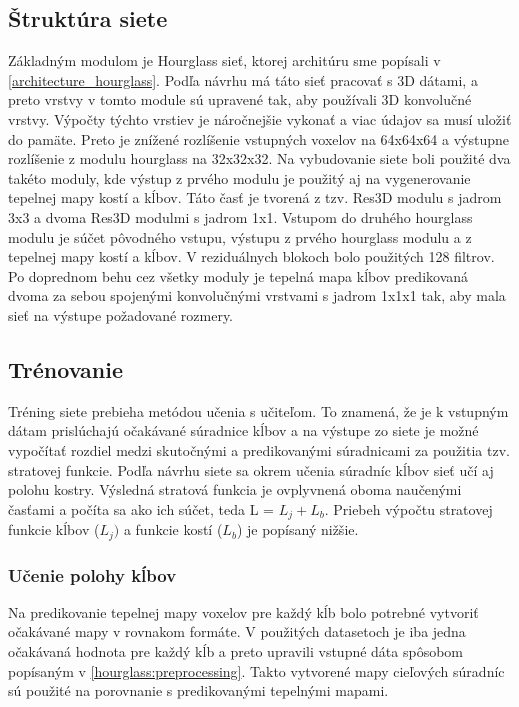 \subsection{Štruktúra siete}
Základným modulom je Hourglass sieť, ktorej architúru sme popísali v \ref{architecture_hourglass}. Podľa návrhu má táto sieť pracovať s 3D dátami, a preto vrstvy v tomto module sú upravené tak, aby používali 3D konvolučné vrstvy. Výpočty týchto vrstiev je náročnejšie vykonať a viac údajov sa musí uložiť do pamäte. Preto je znížené rozlíšenie vstupných voxelov na 64x64x64 a výstupne rozlíšenie z modulu hourglass na 32x32x32. Na vybudovanie siete boli použité dva takéto moduly, kde výstup z prvého modulu je použitý aj na vygenerovanie tepelnej mapy kostí a kĺbov. Táto časť je tvorená z tzv. Res3D modulu s jadrom 3x3 a dvoma Res3D modulmi s jadrom 1x1. Vstupom do druhého hourglass modulu je súčet pôvodného vstupu, výstupu z prvého hourglass modulu a z tepelnej mapy kostí a kĺbov. V reziduálnych blokoch bolo použitých 128 filtrov. Po doprednom behu cez všetky moduly je tepelná mapa kĺbov predikovaná dvoma za sebou spojenými konvolučnými vrstvami s jadrom 1x1x1 tak, aby mala sieť na výstupe požadované rozmery.

\subsection{Trénovanie}
Tréning siete prebieha metódou učenia s učiteľom. To znamená, že je k vstupným dátam prislúchajú očakávané súradnice kĺbov a na výstupe zo siete je možné vypočítať rozdiel medzi skutočnými a predikovanými súradnicami za použitia tzv. stratovej funkcie. Podľa návrhu siete sa okrem učenia súradníc kĺbov sieť učí aj polohu kostry. Výsledná stratová funkcia je ovplyvnená oboma naučenými časťami a počíta sa ako ich súčet, teda L = $L_j + L_b$. Priebeh výpočtu stratovej funkcie kĺbov ($L_j)$ a funkcie kostí ($L_b$) je popísaný nižšie.

\subsubsection{Učenie polohy kĺbov}\label{jointLearning}
Na predikovanie tepelnej mapy voxelov pre každý kĺb bolo potrebné vytvoriť očakávané mapy v rovnakom formáte. V použitých datasetoch je iba jedna očakávaná hodnota pre každý kĺb a preto upravili vstupné dáta spôsobom popísaným v \ref{hourglass:preprocessing}. Takto vytvorené mapy cieľových súradníc sú použité na porovnanie s predikovanými tepelnými mapami.

